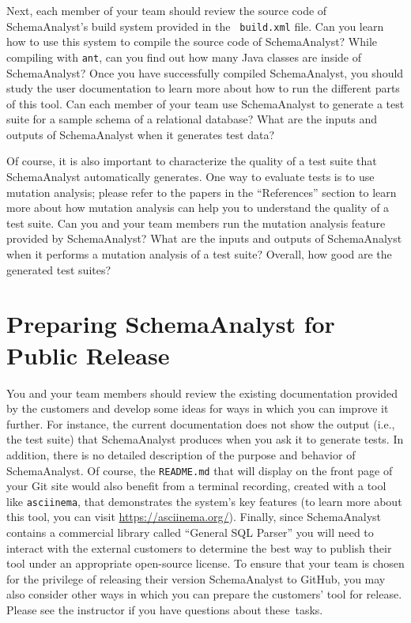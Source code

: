 Next, each member of your team should review the source code of SchemaAnalyst's build system provided in the {\tt
build.xml} file. Can you learn how to use this system to compile the source code of SchemaAnalyst? While compiling with
{\tt ant}, can you find out how many Java classes are inside of SchemaAnalyst? Once you have successfully compiled
SchemaAnalyst, you should study the user documentation to learn more about how to run the different parts of this tool.
Can each member of your team use SchemaAnalyst to generate a test suite for a sample schema of a relational database?
What are the inputs and outputs of SchemaAnalyst when it generates test data?

Of course, it is also important to characterize the quality of a test suite that SchemaAnalyst automatically generates.
One way to evaluate tests is to use mutation analysis; please refer to the papers in the ``References'' section to learn
more about how mutation analysis can help you to understand the quality of a test suite. Can you and your team members
run the mutation analysis feature provided by SchemaAnalyst? What are the inputs and outputs of SchemaAnalyst when it
performs a mutation analysis of a test suite? Overall, how good are the generated test suites?

\vspace*{-.05in}
\section*{Preparing SchemaAnalyst for Public Release}

You and your team members should review the existing documentation provided by the customers and develop some ideas for
ways in which you can improve it further. For instance, the current documentation does not show the output (i.e., the
test suite) that SchemaAnalyst produces when you ask it to generate tests. In addition, there is no detailed description
of the purpose and behavior of SchemaAnalyst. Of course, the {\tt README.md} that will display on the front page of your
Git site would also benefit from a terminal recording, created with a tool like {\tt asciinema}, that demonstrates the
system's key features (to learn more about this tool, you can visit \url{https://asciinema.org/}). Finally, since
SchemaAnalyst contains a commercial library called ``General SQL Parser'' you will need to interact with the external
customers to determine the best way to publish their tool under an appropriate open-source license. To ensure that your
team is chosen for the privilege of releasing their version SchemaAnalyst to GitHub, you may also consider other ways in
which you can prepare the customers' tool for release. Please see the instructor if you have questions about \mbox{these
tasks}.

